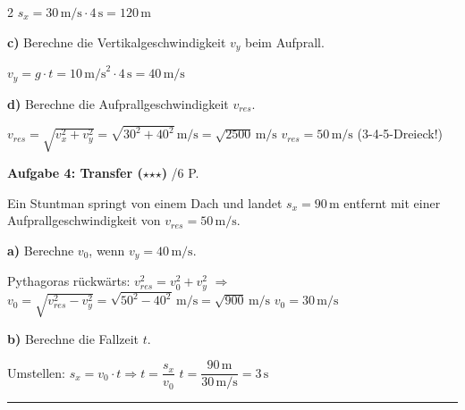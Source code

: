 \documentclass[10pt, a4paper]{article}
\newcommand{\fachfarbe}{physik}
\newcommand{\stmark}{$\star$}
\newcommand{\abschnitt}[1]{%
    \vspace{8pt}
    \noindent\textbf{\textcolor{\fachfarbe}{#1}}
    \vspace{4pt}
}
\newcommand{\punkte}[1]{\hfill\small\textcolor{grau}{/#1 P.}}
\begin{document}
\begin{multicols}{2}
\textcolor{loesung}{$s_x = 30\,\text{m/s} \cdot 4\,\text{s} = \boxed{120\,\text{m}}$}

\vspace{2pt}

\textbf{c)} Berechne die Vertikalgeschwindigkeit $v_y$ beim Aufprall.

\textcolor{loesung}{$v_y = g \cdot t = 10\,\text{m/s}^2 \cdot 4\,\text{s} = \boxed{40\,\text{m/s}}$}

\vspace{2pt}

\textbf{d)} Berechne die Aufprallgeschwindigkeit $v_{res}$.

\textcolor{loesung}{$v_{res} = \sqrt{v_x^2 + v_y^2} = \sqrt{30^2 + 40^2}\,\text{m/s} = \sqrt{2500}\,\text{m/s}$ \quad $\boxed{v_{res} = 50\,\text{m/s}}$ (3-4-5-Dreieck!)}

\vspace{4pt}


\abschnitt{Aufgabe 4: Transfer (\stmark\stmark\stmark)}\punkte{6}

Ein Stuntman springt von einem Dach und landet $s_x = 90\,\text{m}$ entfernt mit einer Aufprallgeschwindigkeit von $v_{res} = 50\,\text{m/s}$.

\textbf{a)} Berechne $v_0$, wenn $v_y = 40\,\text{m/s}$.

\textcolor{loesung}{Pythagoras rückwärts: $v_{res}^2 = v_0^2 + v_y^2$ $\Rightarrow$ $v_0 = \sqrt{v_{res}^2 - v_y^2} = \sqrt{50^2 - 40^2}\,\text{m/s} = \sqrt{900}\,\text{m/s}$ \quad $\boxed{v_0 = 30\,\text{m/s}}$}

\vspace{2pt}

\textbf{b)} Berechne die Fallzeit $t$.

\textcolor{loesung}{Umstellen: $s_x = v_0 \cdot t \Rightarrow t = \dfrac{s_x}{v_0}$ \quad $t = \dfrac{90\,\text{m}}{30\,\text{m/s}} = \boxed{3\,\text{s}}$}

\end{multicols}


\vspace{4pt}
\hrule
\vspace{6pt}
\end{document}
